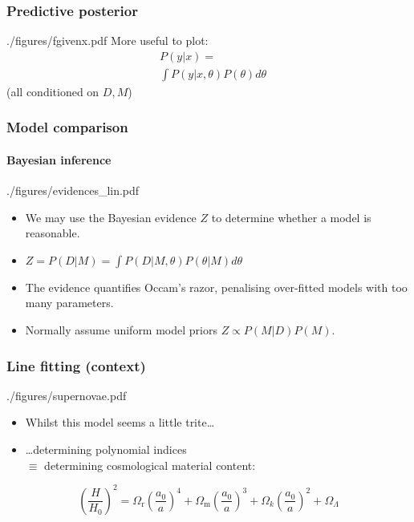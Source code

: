 \documentclass[%
]{beamer}
\begin{document}
\begin{frame}
    \frametitle{Predictive posterior}
    \begin{figright}[0.25]{./figures/fgivenx.pdf}
        More useful to plot:
        \begin{align}
        &P(y|x) = \nonumber\\
        &\int P(y|x,\theta) P(\theta) d\theta \nonumber
        \end{align}
        (all conditioned on $D,M$)
    \end{figright}
\end{frame}

\begin{frame}
    \frametitle{Model comparison}
    \framesubtitle{Bayesian inference}
    \begin{figright}[0.33]{./figures/evidences_lin.pdf}
        \begin{itemize}
            \item We may use the Bayesian evidence $Z$ to determine whether a model is reasonable.
            \item $Z = P(D|M) = \int P(D|M,\theta)P(\theta|M)d\theta$
            \item The evidence quantifies Occam's razor, penalising over-fitted models with too many parameters.
            \item Normally assume uniform model priors $Z \propto P(M|D)P(M)$.
        \end{itemize}
    \end{figright}
\end{frame}

\begin{frame}
    \frametitle{Line fitting (context)}
    \begin{figright}[0.5]{./figures/supernovae.pdf}
        \begin{itemize}
            \item Whilst this model seems a little trite\ldots
            \item\ldots determining polynomial indices \\$\equiv$ determining cosmological material content:
        \end{itemize}
    \end{figright}
        \[
            {\left( \frac{H}{H_0} \right)}^2 = 
            \Omega_\text{r} {\left( \frac{a_0}{a} \right)}^4+
            \Omega_\text{m} {\left( \frac{a_0}{a} \right)}^3+
            \Omega_k {\left( \frac{a_0}{a} \right)}^2+
            \Omega_\Lambda
            \]
\end{frame}
\end{document}
